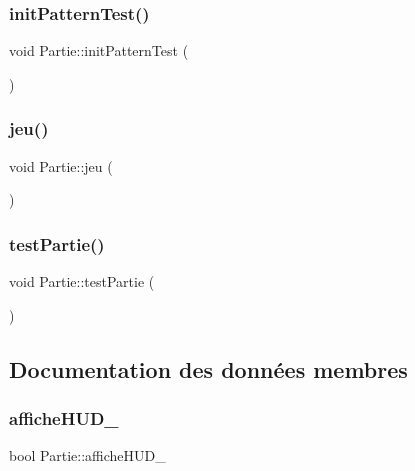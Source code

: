 \mbox{\label{class_partie_a3a0c4920ea230fb971f278a1b22d87a9}} 
\subsubsection{\texorpdfstring{init\+Pattern\+Test()}{initPatternTest()}}
{\footnotesize\ttfamily void Partie\+::init\+Pattern\+Test (\begin{DoxyParamCaption}{ }\end{DoxyParamCaption})}

\mbox{\label{class_partie_a38d54358098b3e5e47d0059a37bff5ea}} 
\subsubsection{\texorpdfstring{jeu()}{jeu()}}
{\footnotesize\ttfamily void Partie\+::jeu (\begin{DoxyParamCaption}{ }\end{DoxyParamCaption})}

\mbox{\label{class_partie_a74a29a9840bdcb69acdd225acd6b336c}} 
\subsubsection{\texorpdfstring{test\+Partie()}{testPartie()}}
{\footnotesize\ttfamily void Partie\+::test\+Partie (\begin{DoxyParamCaption}{ }\end{DoxyParamCaption})}



\subsection{Documentation des données membres}
\mbox{\label{class_partie_a253b0099bf8ef4c3dce2fe3e3dd8def5}} 
\subsubsection{\texorpdfstring{affiche\+H\+U\+D\+\_\+}{afficheHUD\_}}
{\footnotesize\ttfamily bool Partie\+::affiche\+H\+U\+D\+\_\+\hspace{0.3cm}{\ttfamily [protected]}}

